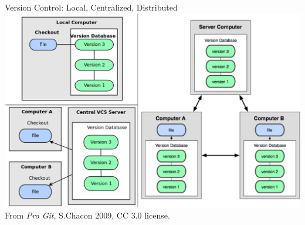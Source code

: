 \documentclass{beamer}
\begin{document}
\begin{frame}{Version Control: Local, Centralized, Distributed}
  \includegraphics[width=1.05\linewidth]{figs/vc_paradigms}
\\
\small
From \emph{Pro Git}, S.Chacon 2009, CC 3.0 license.
\end{frame}

\end{document}

